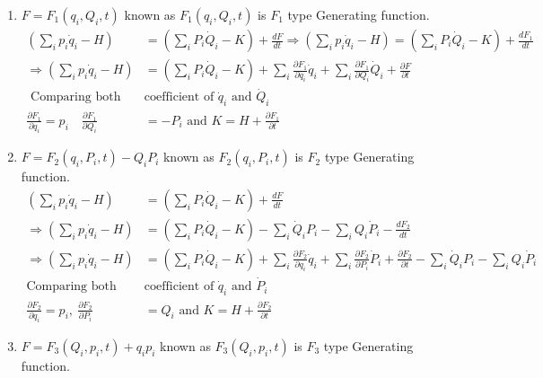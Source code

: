 \begin{enumerate}
	\item  $F=F_{1}\left(q_{i}, Q_{i}, t\right)$ known as $F_{1}\left(q_{i}, Q_{i}, t\right)$ is $F_{1}$ type Generating function.
	$$
	\begin{aligned}
	\left(\sum_{i} p_{i} \dot{q}_{i}-H\right)&=\left(\sum_{i} P_{i} \dot{Q}_{i}-K\right)+\frac{d F}{d t} \Rightarrow\left(\sum_{i} p_{i} \dot{q}_{i}-H\right)=\left(\sum_{i} P_{i} \dot{Q}_{i}-K\right)+\frac{d F_{1}}{d t} \\
	\Rightarrow\left(\sum_{i} p_{i} \dot{q}_{i}-H\right)&=\left(\sum_{i} P_{i} \dot{Q}_{i}-K\right)+\sum_{i} \frac{\partial F_{1}}{\partial q_{i}} \dot{q}_{i}+\sum_{i} \frac{\partial F_{1}}{\partial Q_{i}} \dot{Q}_{i}+\frac{\partial F}{\partial t}\\
	\text{	Comparing both the }&\text{coefficient of $\dot{q}_{i}$ and $\dot{Q}_{i}$}\\
	\frac{\partial F_{1}}{\partial q_{i}}=p_{i} \quad \frac{\partial F_{1}}{\partial Q_{i}}&=-P_{i}\text{ and }K=H+\frac{\partial F_{1}}{\partial t}
	\end{aligned}
	$$
	\item $F=F_{2}\left(q_{i}, P_{i}, t\right)-Q_{i} P_{i}$ known as $F_{2}\left(q_{i}, P_{i}, t\right)$ is $F_{2}$ type Generating function.\\
	$$
	\begin{aligned}
	\left(\sum_{i} p_{i} \dot{q}_{i}-H\right)&=\left(\sum_{i} P_{i} \dot{Q}_{i}-K\right)+\frac{d F}{d t} \\
	\Rightarrow\left(\sum_{i} p_{i} \dot{q}_{i}-H\right)&=\left(\sum_{i} P_{i} \dot{Q}_{i}-K\right)-\sum_{i} \dot{Q}_{i} P_{i}-\sum_{i} Q_{i} \dot{P}_{i}-\frac{d F_{2}}{d t} \\
	\Rightarrow\left(\sum_{i} p_{i} \dot{q}_{i}-H\right)&=\left(\sum_{i} P_{i} \dot{Q}_{i}-K\right)+\sum_{i} \frac{\partial F_{2}}{\partial q_{i}} \dot{q}_{i}+\sum_{i} \frac{\partial F_{2}}{\partial P_{i}} \dot{P}_{i}+\frac{\partial F_{2}}{\partial t}-\sum_{i} \dot{Q}_{i} P_{i}-\sum_{i} Q_{i} \dot{P}_{i}\\
	\text{Comparing both the }&\text{coefficient of $\dot{q}_{i}$ and $\dot{P}_{i}$}\\
	\frac{\partial F_{2}}{\partial q_{i}}=p_{i}, \ \frac{\partial F_{2}}{\partial P_{i}}&=Q_{i}\text{ and }K=H+\frac{\partial F_{2}}{\partial t}
	\end{aligned}
	$$
	\item  $F=F_{3}\left(Q_{i}, p_{i}, t\right)+q_{i} p_{i}$ known as $F_{3}\left(Q_{i}, p_{i}, t\right)$ is $F_{3}$ type Generating function.

\end{enumerate}
